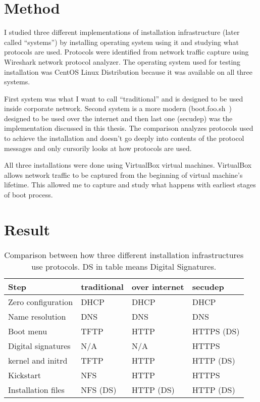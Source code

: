 
\section{Method}

I studied three different implementations of installation
infrastructure (later called ``systems'') by installing operating
system using it and studying what protocols are used. Protocols were
identified from network traffic capture using Wireshark network
protocol analyzer. The operating system used for testing installation
was CentOS Linux Distribution because it was available on all three
systems.

First system was what I want to call ``traditional'' and is designed
to be used inside corporate network. Second system is a more modern
(boot.foo.sh~\cite{boot-foo-sh}) designed to be used over the internet
and then last one (secudep) was the implementation discussed in this
thesis. The comparison analyzes protocols used to achieve the
installation and doesn't go deeply into contents of the protocol
messages and only cursorily looks at how protocols are used.

All three installations were done using VirtualBox virtual
machines. VirtualBox allows network traffic to be captured from the
beginning of virtual machine's lifetime. This allowed me to capture
and study what happens with earliest stages of boot process.

\section{Result}

\begin{table}[!ht]
  \def\arraystretch{1.1}%
  \begin{center}
    \begin{tabular}{| l | l | l | l |}
      \hline
      Step               & traditional & over internet & secudep    \\
      \hline
      Zero configuration & DHCP        & DHCP          & DHCP       \\
      Name resolution    & DNS         & DNS           & DNS        \\
      Boot menu          & TFTP        & HTTP          & HTTPS (DS) \\
      Digital signatures & N/A         & N/A           & HTTPS      \\
      kernel and initrd  & TFTP        & HTTP          & HTTP (DS)  \\
      Kickstart          & NFS         & HTTP          & HTTPS      \\
      Installation files & NFS (DS)    & HTTP (DS)     & HTTP (DS)  \\
      \hline
    \end{tabular}
    \caption{Comparison between how three different installation
      infrastructures use protocols. DS in table means Digital
      Signatures.}
    \label{tab:comparison_table}
  \end{center}
\end{table}

